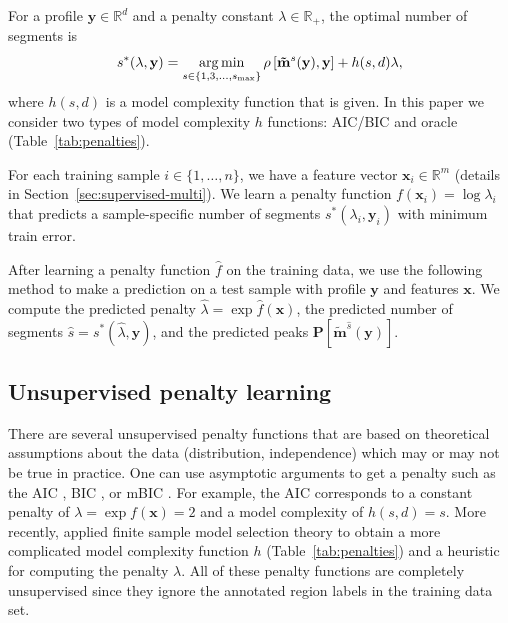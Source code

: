 \documentclass{article}
\DeclareMathOperator*{\argmin}{arg\,min}
\newcommand{\RR}{\mathbb R}
\begin{document}
For a profile $\mathbf y\in\RR^d$ and a penalty constant $\lambda\in\RR_+$, the
optimal number of segments is
\begin{equation}
  \label{eq:optimal_segments}
  s^*(\lambda, \mathbf y) =
  \argmin_{s\in\{1,3,\dots, s_{\text{\text{max}}}\}}
  \rho\left[
    \mathbf{\tilde m}^s(\mathbf y),
    \mathbf y
  \right]
  + h(s, d) \lambda,
\end{equation}
where $h(s, d)$ is a model complexity function that is given. In
this paper we consider two types of model complexity $h$ functions:
AIC/BIC and oracle (Table~\ref{tab:penalties}). 

For each training sample $i\in\{1,\dots, n\}$, we have a feature
vector $\mathbf x_i\in\RR^m$ (details in
Section~\ref{sec:supervised-multi}). We learn a penalty function
$f(\mathbf x_i) = \log \lambda_i$ that predicts a sample-specific
number of segments $s^*(\lambda_i, \mathbf y_i)$ with minimum train
error.

After learning a penalty function $\hat f$ on the training
data, we use the following method to make a prediction on a test
sample with profile $\mathbf y$ and features $\mathbf x$. We compute
the predicted penalty $\hat \lambda = \exp \hat f(\mathbf x)$, the
predicted number of segments $\hat s = s^*(\hat \lambda, \mathbf y)$,
and the predicted peaks $\mathbf P\left[ \mathbf{\tilde
    m}^{\hat s}(\mathbf y) \right]$.

\subsection{Unsupervised penalty learning}
\label{sec:unsupervised}


There are several unsupervised penalty functions that are based on theoretical
assumptions about the data (distribution, independence) which may or
may not be true in practice. One can use asymptotic arguments to get a
penalty such as the AIC \citep{Akaike73}, BIC \citep{Schwarz78}, or
mBIC \citep{mBIC}. For example, the AIC corresponds to a constant
penalty of $\lambda=\exp f(\mathbf x)=2$ and a model complexity of
$h(s, d)=s$. More recently, \citet{cleynen2013segmentation} applied
finite sample model selection theory to obtain a more complicated
model complexity function $h$ (Table~\ref{tab:penalties}) and a
heuristic for computing the penalty $\lambda$. All of these penalty
functions are completely unsupervised since they ignore the annotated
region labels in the training data set.
\end{document}
